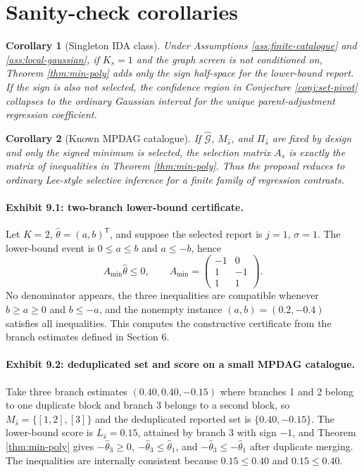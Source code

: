 \documentclass[11pt]{article}
\newcommand{\transpose}{\mathsf{T}}
\theoremstyle{definition}
\theoremstyle{plain}
\newtheorem{corollary}{Corollary}
\theoremstyle{remark}
\begin{document}
\section{Sanity-check corollaries}
\begin{corollary}[Singleton IDA class]\label{cor:singleton}
Under Assumptions \ref{ass:finite-catalogue} and \ref{ass:local-gaussian}, if $K_{\widehat s}=1$ and the graph screen is not conditioned on, Theorem \ref{thm:min-poly} adds only the sign half-space for the lower-bound report. If the sign is also not selected, the confidence region in Conjecture \ref{conj:set-pivot} collapses to the ordinary Gaussian interval for the unique parent-adjustment regression coefficient.
\end{corollary}

\begin{corollary}[Known MPDAG catalogue]\label{cor:known-catalogue}
If $\widehat{\mathcal G}$, $M_{\widehat s}$, and $\Pi_{\widehat s}$ are fixed by design and only the signed minimum is selected, the selection matrix $A_s$ is exactly the matrix of inequalities in Theorem \ref{thm:min-poly}. Thus the proposal reduces to ordinary Lee-style selective inference for a finite family of regression contrasts.
\end{corollary}

\paragraph{Exhibit 9.1: two-branch lower-bound certificate.}
Let $K=2$, $\widehat\theta=(a,b)^\transpose$, and suppose the selected report is $j=1$, $\sigma=1$. The lower-bound event is $0\le a\le b$ and $a\le -b$, hence
\[
A_{\min}\widehat\theta\le 0,\qquad
A_{\min}=
\begin{pmatrix}
-1&0\\
1&-1\\
1&1
\end{pmatrix}.
\]
No denominator appears, the three inequalities are compatible whenever $b\ge a\ge0$ and $b\le -a$, and the nonempty instance $(a,b)=(0.2,-0.4)$ satisfies all inequalities. This computes the constructive certificate from the branch estimates defined in Section 6.

\paragraph{Exhibit 9.2: deduplicated set and score on a small MPDAG catalogue.}
Take three branch estimates $(0.40,0.40,-0.15)$ where branches 1 and 2 belong to one duplicate block and branch 3 belongs to a second block, so $M_{\widehat s}=\{[1,2],[3]\}$ and the deduplicated reported set is $\{0.40,-0.15\}$. The lower-bound score is $L_{\widehat s}=0.15$, attained by branch 3 with sign $-1$, and Theorem \ref{thm:min-poly} gives $-\widehat\theta_3\ge0$, $-\widehat\theta_3\le \widehat\theta_1$, and $-\widehat\theta_3\le-\widehat\theta_1$ after duplicate merging. The inequalities are internally consistent because $0.15\le0.40$ and $0.15\le0.40$.
\end{document}
